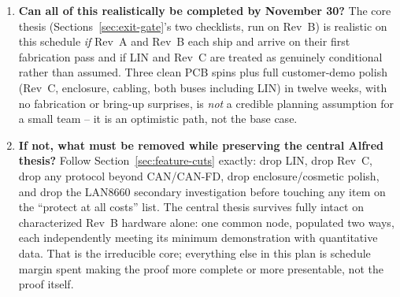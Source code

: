 \begin{enumerate}[itemsep=0.4em]
\item \textbf{Can all of this realistically be completed by November 30?}
The core thesis (Sections~\ref{sec:exit-gate}'s two checklists, run on Rev~B) is realistic on this schedule \emph{if} Rev~A and Rev~B each ship and arrive on their first fabrication pass and if LIN and Rev~C are treated as genuinely conditional rather than assumed. Three clean PCB spins plus full customer-demo polish (Rev~C, enclosure, cabling, both buses including LIN) in twelve weeks, with no fabrication or bring-up surprises, is \emph{not} a credible planning assumption for a small team -- it is an optimistic path, not the base case.

\item \textbf{If not, what must be removed while preserving the central Alfred thesis?}
Follow Section~\ref{sec:feature-cuts} exactly: drop LIN, drop Rev~C, drop any protocol beyond CAN/CAN-FD, drop enclosure/cosmetic polish, and drop the LAN8660 secondary investigation before touching any item on the ``protect at all costs'' list. The central thesis survives fully intact on characterized Rev~B hardware alone: one common node, populated two ways, each independently meeting its minimum demonstration with quantitative data. That is the irreducible core; everything else in this plan is schedule margin spent making the proof more complete or more presentable, not the proof itself.

\end{enumerate}
